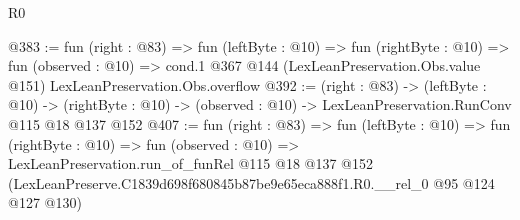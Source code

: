 \begin{lexlean}{R0}
\begin{coremodule}
@383 := fun (right : @83) =>
  fun (leftByte : @10) =>
  fun (rightByte : @10) =>
  fun (observed : @10) =>
  cond.{1} @367 @144 (LexLeanPreservation.Obs.value @151) LexLeanPreservation.Obs.overflow
@392 := (right : @83) ->
  (leftByte : @10) ->
  (rightByte : @10) -> (observed : @10) -> LexLeanPreservation.RunConv @115 @18 @137 @152
@407 := fun (right : @83) =>
  fun (leftByte : @10) =>
  fun (rightByte : @10) =>
  fun (observed : @10) =>
  LexLeanPreservation.run_of_funRel
    @115
    @18
    @137
    @152
    (LexLeanPreserve.C1839d698f680845b87be9e65eca888f1.R0.__rel_0 @95 @124 @127 @130)
\end{coremodule}
\end{lexlean}
